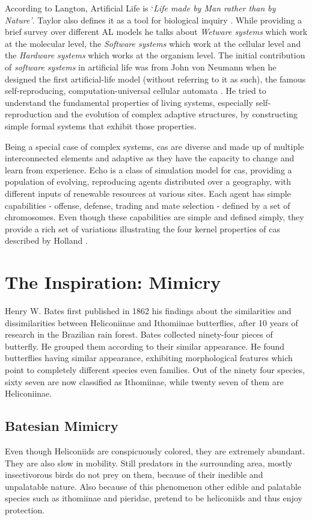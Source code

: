 \documentclass[letterpaper]{article}
\numberwithin{equation}{section}
\begin{document}
According to Langton, Artificial Life is `\textsl{Life made by Man rather than by Nature'}. Taylor also defines it as a tool for biological inquiry \citep{taylor1993}. While providing a brief survey over different AL models he talks about \textsl{Wetware systems} which work at the molecular level, the \textsl{Software systems} which work at the cellular level and the \textsl{Hardware systems} which works at the organism level. The initial contribution of \textsl{software systems} in artificial life was from John von Neumann when he designed the first artificial-life model (without referring to it as such), the famous self-reproducing, computation-universal cellular automata \citep{neumann1966}. He tried to understand the fundamental properties of living systems, especially self-reproduction and the evolution of complex adaptive structures, by constructing simple formal systems that exhibit those properties.

Being a special case of complex systems, \gls{cas} are diverse and made up of multiple interconnected elements and adaptive as they have the capacity to change and learn from experience. Echo \citep{hraber1997} is a class of simulation model for \gls{cas}, providing a population of evolving, reproducing agents distributed over a geography, with different inputs of renewable resources at various sites. Each agent has simple capabilities - offense, defense, trading and mate selection - defined by a set of chromosomes. Even though these capabilities are simple and defined simply, they provide a rich set of variations illustrating the four kernel properties of \gls{cas} described by Holland \citep{holland1996}.

\section{The Inspiration: Mimicry}
\label{section:mimicry}

Henry W. Bates first published in 1862 his findings about the similarities and dissimilarities between Heliconiinae and Ithomiinae butterflies, after 10 years of research in the Brazilian rain forest. Bates collected ninety-four pieces of butterfly. He grouped them according to their similar appearance. He found butterflies having similar appearance, exhibiting morphological features which point to completely different species even families. Out of the ninety four species, sixty seven are now classified as Ithomiinae, while twenty seven of them are Heliconiinae.

\subsection{Batesian Mimicry}
Even though Heliconiids are conspicuously colored, they are extremely abundant. They are also slow in mobility. Still predators in the surrounding area, mostly insectivorous birds do not prey on them, because of their inedible and unpalatable nature. Also because of this phenomenon other edible and palatable species such as ithomiinae and pieridae, pretend to be heliconiids and thus enjoy protection.
\end{document}
